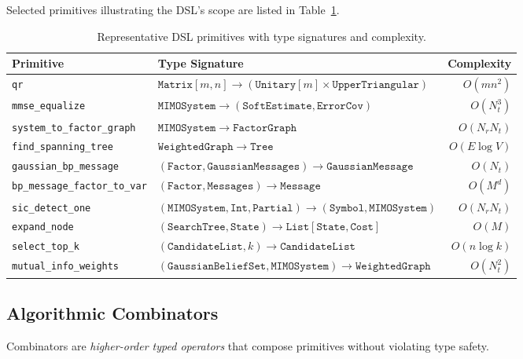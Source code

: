 \documentclass[12pt,a4paper]{article}
\begin{document}
Selected primitives illustrating the DSL's scope are listed in
Table~\ref{tab:primitives}.

\begin{table}[H]
  \centering
  \caption{Representative DSL primitives with type signatures and complexity.}
  \label{tab:primitives}
  \small
  \begin{tabular}{@{}p{3.8cm}p{7.2cm}r@{}}
    \toprule
    \textbf{Primitive} & \textbf{Type Signature} & \textbf{Complexity} \\
    \midrule
    \texttt{qr} & $\mathtt{Matrix}[m,n]\to(\mathtt{Unitary}[m]\times\mathtt{UpperTriangular})$ & $O(mn^2)$ \\
    \texttt{mmse\_equalize} & $\mathtt{MIMOSystem}\to(\mathtt{SoftEstimate},\mathtt{ErrorCov})$ & $O(N_t^3)$ \\
    \texttt{system\_to\_factor\_graph} & $\mathtt{MIMOSystem}\to\mathtt{FactorGraph}$ & $O(N_rN_t)$ \\
    \texttt{find\_spanning\_tree} & $\mathtt{WeightedGraph}\to\mathtt{Tree}$ & $O(E\log V)$ \\
    \texttt{gaussian\_bp\_message} & $(\mathtt{Factor},\mathtt{GaussianMessages})\to\mathtt{GaussianMessage}$ & $O(N_t)$ \\
    \texttt{bp\_message\_factor\_to\_var} & $(\mathtt{Factor},\mathtt{Messages})\to\mathtt{Message}$ & $O(M^d)$ \\
    \texttt{sic\_detect\_one} & $(\mathtt{MIMOSystem},\mathtt{Int},\mathtt{Partial})\to(\mathtt{Symbol},\mathtt{MIMOSystem})$ & $O(N_rN_t)$ \\
    \texttt{expand\_node} & $(\mathtt{SearchTree},\mathtt{State})\to\mathtt{List[State,Cost]}$ & $O(M)$ \\
    \texttt{select\_top\_k} & $(\mathtt{CandidateList},k)\to\mathtt{CandidateList}$ & $O(n\log k)$ \\
    \texttt{mutual\_info\_weights} & $(\mathtt{GaussianBeliefSet},\mathtt{MIMOSystem})\to\mathtt{WeightedGraph}$ & $O(N_t^2)$ \\
    \bottomrule
  \end{tabular}
\end{table}

\subsection{Algorithmic Combinators}

Combinators are \emph{higher-order typed operators} that compose primitives
without violating type safety.
\end{document}
